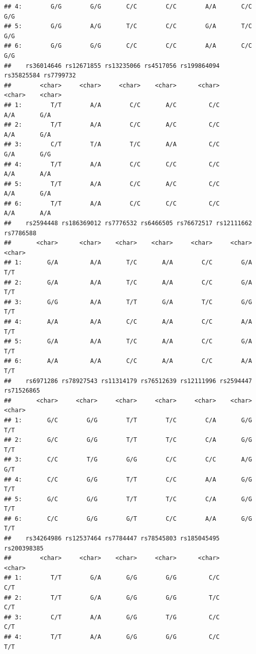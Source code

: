 \documentclass[
]{article}
\begin{document}
\begin{verbatim}
## 4:        G/G        G/G       C/C        C/C        A/A       C/C        G/G
## 5:        G/G        A/G       T/C        C/C        G/A       T/C        G/G
## 6:        G/G        G/G       C/C        C/C        A/A       C/C        G/G
##    rs36014646 rs12671855 rs13235066 rs4517056 rs199864094 rs35825584 rs7799732
##        <char>     <char>     <char>    <char>      <char>     <char>    <char>
## 1:        T/T        A/A        C/C       A/C         C/C        A/A       G/A
## 2:        T/T        A/A        C/C       A/C         C/C        A/A       G/A
## 3:        C/T        T/A        T/C       A/A         C/C        G/A       G/G
## 4:        T/T        A/A        C/C       C/C         C/C        A/A       A/A
## 5:        T/T        A/A        C/C       A/C         C/C        A/A       G/A
## 6:        T/T        A/A        C/C       C/C         C/C        A/A       A/A
##    rs2594448 rs186369012 rs7776532 rs6466505 rs76672517 rs12111662 rs7786588
##       <char>      <char>    <char>    <char>     <char>     <char>    <char>
## 1:       G/A         A/A       T/C       A/A        C/C        G/A       T/T
## 2:       G/A         A/A       T/C       A/A        C/C        G/A       T/T
## 3:       G/G         A/A       T/T       G/A        T/C        G/G       T/T
## 4:       A/A         A/A       C/C       A/A        C/C        A/A       T/T
## 5:       G/A         A/A       T/C       A/A        C/C        G/A       T/T
## 6:       A/A         A/A       C/C       A/A        C/C        A/A       T/T
##    rs6971286 rs78927543 rs11314179 rs76512639 rs12111996 rs2594447 rs71526865
##       <char>     <char>     <char>     <char>     <char>    <char>     <char>
## 1:       G/C        G/G        T/T        T/C        C/A       G/G        T/T
## 2:       G/C        G/G        T/T        T/C        C/A       G/G        T/T
## 3:       C/C        T/G        G/G        C/C        C/C       A/G        G/T
## 4:       C/C        G/G        T/T        C/C        A/A       G/G        T/T
## 5:       G/C        G/G        T/T        T/C        C/A       G/G        T/T
## 6:       C/C        G/G        G/T        C/C        A/A       G/G        T/T
##    rs34264986 rs12537464 rs7784447 rs78545803 rs185045495 rs200398385
##        <char>     <char>    <char>     <char>      <char>      <char>
## 1:        T/T        G/A       G/G        G/G         C/C         C/T
## 2:        T/T        G/A       G/G        G/G         T/C         C/T
## 3:        C/T        A/A       G/G        T/G         C/C         C/T
## 4:        T/T        A/A       G/G        G/G         C/C         T/T

\end{verbatim}
\end{document}
